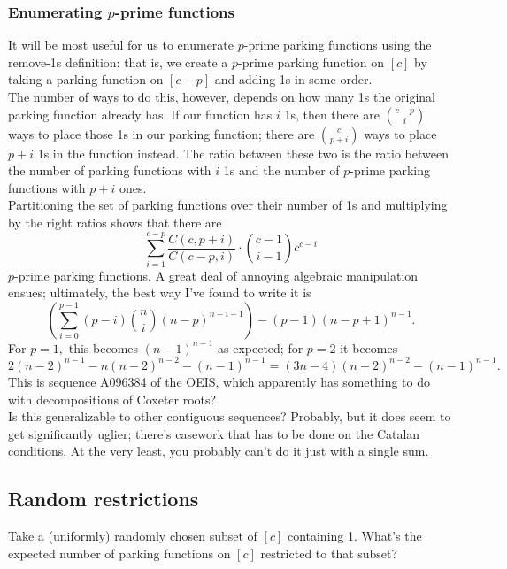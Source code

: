 \subsubsection*{Enumerating $p$-prime functions}

It will be most useful for us to enumerate $p$-prime parking functions using the remove-1s definition: that is, we create a $p$-prime parking function on $[c]$ by taking a parking function on $[c-p]$ and adding 1s in some order.\\

The number of ways to do this, however, depends on how many 1s the original parking function already has. If our function has $i$ 1s, then there are $\binom{c-p}{i}$ ways to place those 1s in our parking function; there are $\binom{c}{p+i}$ ways to place $p+i$ 1s in the function instead. The ratio between these two is the ratio between the number of parking functions with $i$ 1s and the number of $p$-prime parking functions with $p+i$ ones.\\

Partitioning the set of parking functions over their number of 1s and multiplying by the right ratios shows that there are $$\sum_{i=1}^{c-p}\frac{C(c,p+i)}{C(c-p,i)}\cdot\binom{c-1}{i-1}c^{c-i}$$ $p$-prime parking functions. A great deal of annoying algebraic manipulation ensues; ultimately, the best way I've found to write it is $$\left(\sum_{i=0}^{p-1}(p-i)\binom{n}{i}(n-p)^{n-i-1}\right)-(p-1)(n-p+1)^{n-1}.$$ For $p=1,$ this becomes $(n-1)^{n-1}$ as expected; for $p=2$ it becomes $2(n-2)^{n-1}-n(n-2)^{n-2}-(n-1)^{n-1}=(3n-4)(n-2)^{n-2}-(n-1)^{n-1}.$ This is sequence \href{https://oeis.org/A096364}{A096384} of the OEIS, which apparently has something to do with decompositions of Coxeter roots?\\

Is this generalizable to other contiguous sequences? Probably, but it does seem to get significantly uglier; there's casework that has to be done on the Catalan conditions. At the very least, you probably can't do it just with a single sum.

\subsection*{Random restrictions}

Take a (uniformly) randomly chosen subset of $[c]$ containing 1. What's the expected number of parking functions on $[c]$ restricted to that subset?\\

